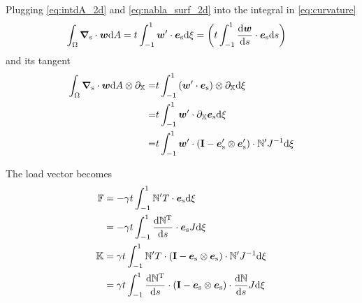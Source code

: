\documentclass[a4paper,11pt]{article}
\newcommand{\ta}[1]{\text{\boldmath $#1$}} %
\newcommand{\ts}[1]{\text{\boldmath $\mathrm{#1}$}} %
\newcommand{\uv}[1]{\mathbb{#1}}
\newcommand{\um}[1]{\mathbb{#1}}
\newcommand{\dif}[1]{\mathrm{d}#1}
\newcommand{\diff}{\ta{\nabla}}
\newcommand{\pderiv}[2]{\partial_{#2} #1}
\newcommand{\dderiv}[2]{\frac{\mathrm{d}#1}{\mathrm{d}#2}}
\newcommand{\T}{\mathrm{T}}
\newcommand{\surf}{\mathrm{s}}
\DeclareMathOperator{\sign}{sign}
\begin{document}
Plugging \eqref{eq:intdA_2d} and \eqref{eq:nabla_surf_2d} into the integral in \eqref{eq:curvature}
\begin{align}
 \int_\Omega\diff_\surf\cdot\ta w\dif A &= t \int_{-1}^{1} \ta w'\cdot \ta e_\surf \dif\xi = \left( t \int_{-1}^1 \dderiv{\ta w}{s} \cdot \ta e_\surf\dif s\right)
\end{align}
and its tangent
\begin{align}
 \int_\Omega\diff_\surf\cdot\ta w\dif A \otimes \pderiv{}{\uv X}
 =&t \int_{-1}^{1} \left(\ta w'\cdot \ta e_\surf\right)\otimes \pderiv{}{\uv X}  \dif\xi\\
 =&t \int_{-1}^{1} \ta w'\cdot \pderiv{\ta e_\surf}{\uv X} \dif\xi\\
 =&t \int_{-1}^{1} \ta w'\cdot \left(\ts I-\ta e_\surf'\otimes\ta e_\surf' \right)\cdot \um N' J^{-1} \dif\xi
\end{align}


The load vector becomes
\begin{align}
 \uv F &= -\gamma t \int_{-1}^{1} {\um N}'^\T\cdot \ta e_\surf \dif\xi\\
       &= -\gamma t \int_{-1}^{1} \dderiv{{\um N}^\T}{s}\cdot \ta e_\surf J \dif\xi \\
 \um K &= \gamma t \int_{-1}^{1} {\um N}'^\T\cdot \left(\ts I-\ta e_\surf\otimes\ta e_\surf\right)\cdot{\um N}' J^{-1} \dif\xi\\
       &=  \gamma t \int_{-1}^{1} \dderiv{\um N^\T}{s}\cdot \left(\ts I-\ta e_\surf\otimes\ta e_\surf\right)\cdot\dderiv{\um N}{s} J \dif\xi
\end{align}
\end{document}
